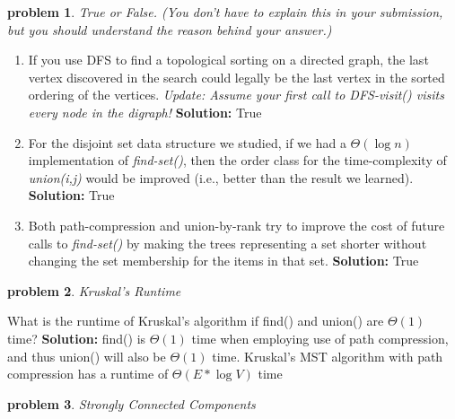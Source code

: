\documentclass[10pt]{article}
\newcommand{\solution}[1]{\color{blue}\hfill\break\noindent\textbf{Solution:} #1\color{black}}
\newtheorem{problem}{\sc\color{cit}problem}
\begin{document}
\begin{problem} True or False. (You don't have to explain this in your submission, but you should understand the reason behind your answer.)  \end{problem}

\begin{enumerate}
\renewcommand{\theenumi}{\Alph{enumi}}

    \item  If you use DFS to find a topological sorting on a directed graph, the last vertex discovered in the search could legally be the last vertex in the sorted ordering of the vertices. {\em Update: Assume your first call to DFS-visit() visits every node in the digraph!}
    \solution{
    True
    }
    
    \item For the disjoint set data structure we studied, if we had a $\Theta(\log n)$ implementation of \emph{find-set()}, then the order class for the time-complexity of \emph{union(i,j)} would be improved (i.e., better than the result we learned).
    \solution{
    True
    }
    
    \item Both path-compression and union-by-rank try to improve the cost of future calls to \emph{find-set()} by making the trees representing a set shorter without changing the set membership for the items in that set.
    \solution{
    True
    }
    
\end{enumerate}

\begin{problem} Kruskal's Runtime \end{problem}
What is the runtime of Kruskal’s algorithm if find() and union() are $\Theta(1)$ time?
\solution{
    find() is $\Theta(1)$ time when employing use of path compression, and thus union() will also be $\Theta(1)$ time. Kruskal's MST algorithm with path compression has a runtime of $\Theta(E * \log V)$ time
}

\begin{problem} Strongly Connected Components \end{problem}
\end{document}
